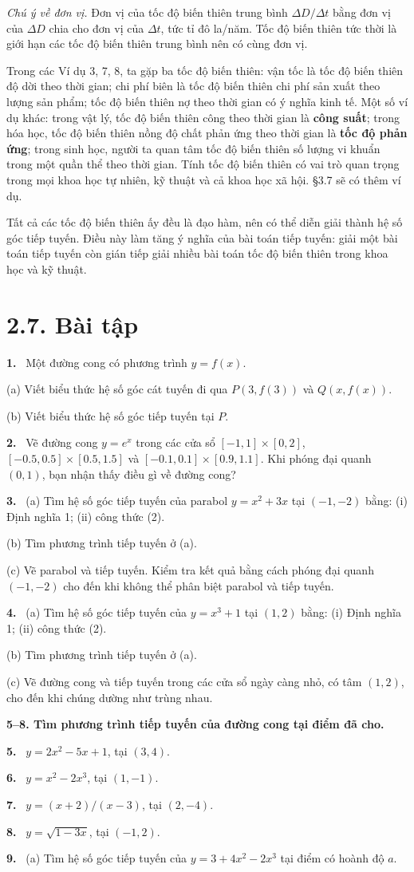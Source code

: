 \documentclass[12pt,a4paper]{article}
\newcommand{\bt}[1]{\par\smallskip\noindent\textbf{#1.}\ }
\newcommand{\group}[1]{\par\medskip\noindent\textbf{#1}\par\nopagebreak[4]}
\begin{document}
\noindent\textit{Chú ý về đơn vị.} Đơn vị của tốc độ biến thiên trung bình $\Delta D/\Delta t$ bằng đơn vị của $\Delta D$ chia cho đơn vị của $\Delta t$, tức tỉ đô la/năm. Tốc độ biến thiên tức thời là giới hạn các tốc độ biến thiên trung bình nên có cùng đơn vị.

Trong các Ví dụ 3, 7, 8, ta gặp ba tốc độ biến thiên: vận tốc là tốc độ biến thiên độ dời theo thời gian; chi phí biên là tốc độ biến thiên chi phí sản xuất theo lượng sản phẩm; tốc độ biến thiên nợ theo thời gian có ý nghĩa kinh tế. Một số ví dụ khác: trong vật lý, tốc độ biến thiên công theo thời gian là \textbf{công suất}; trong hóa học, tốc độ biến thiên nồng độ chất phản ứng theo thời gian là \textbf{tốc độ phản ứng}; trong sinh học, người ta quan tâm tốc độ biến thiên số lượng vi khuẩn trong một quần thể theo thời gian. Tính tốc độ biến thiên có vai trò quan trọng trong mọi khoa học tự nhiên, kỹ thuật và cả khoa học xã hội. §3.7 sẽ có thêm ví dụ.

Tất cả các tốc độ biến thiên ấy đều là đạo hàm, nên có thể diễn giải thành hệ số góc tiếp tuyến. Điều này làm tăng ý nghĩa của bài toán tiếp tuyến: giải một bài toán tiếp tuyến còn gián tiếp giải nhiều bài toán tốc độ biến thiên trong khoa học và kỹ thuật.
\clearpage
\section*{2.7. Bài tập}
\bt{1} Một đường cong có phương trình $y=f(x)$.

(a) Viết biểu thức hệ số góc cát tuyến đi qua $P(3,f(3))$ và $Q(x,f(x))$.

(b) Viết biểu thức hệ số góc tiếp tuyến tại $P$.
\bt{2} Vẽ đường cong $y=e^x$ trong các cửa sổ $[-1,1]\times[0,2]$, $[-0.5,0.5]\times[0.5,1.5]$ và $[-0.1,0.1]\times[0.9,1.1]$. Khi phóng đại quanh $(0,1)$, bạn nhận thấy điều gì về đường cong?
\bt{3} (a) Tìm hệ số góc tiếp tuyến của parabol $y=x^2+3x$ tại $(-1,-2)$ bằng: (i) Định nghĩa 1; (ii) công thức (2).

(b) Tìm phương trình tiếp tuyến ở (a).

(c) Vẽ parabol và tiếp tuyến. Kiểm tra kết quả bằng cách phóng đại quanh $(-1,-2)$ cho đến khi không thể phân biệt parabol và tiếp tuyến.
\bt{4} (a) Tìm hệ số góc tiếp tuyến của $y=x^3+1$ tại $(1,2)$ bằng: (i) Định nghĩa 1; (ii) công thức (2).

(b) Tìm phương trình tiếp tuyến ở (a).

(c) Vẽ đường cong và tiếp tuyến trong các cửa sổ ngày càng nhỏ, có tâm $(1,2)$, cho đến khi chúng dường như trùng nhau.
\group{5–8. Tìm phương trình tiếp tuyến của đường cong tại điểm đã cho.}
\bt{5} $y=2x^2-5x+1$, tại $(3,4)$.
\bt{6} $y=x^2-2x^3$, tại $(1,-1)$.
\bt{7} $y=(x+2)/(x-3)$, tại $(2,-4)$.
\bt{8} $y=\sqrt{1-3x}$, tại $(-1,2)$.
\bt{9} (a) Tìm hệ số góc tiếp tuyến của $y=3+4x^2-2x^3$ tại điểm có hoành độ $a$.
\end{document}
